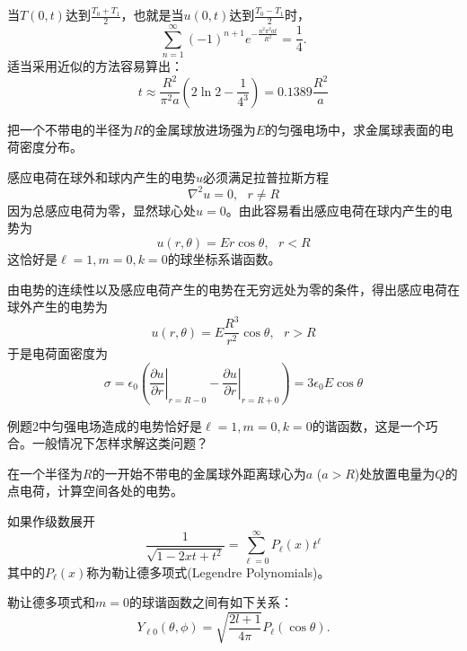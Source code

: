 \documentclass[CJK]{beamer}
\begin{document}
\begin{frame}
\bch
当$T(0,t)$达到$\frac{T_0+T_1}{2}$，也就是当$u(0,t)$达到$\frac{T_0-T_1}{2}$时，
$$\sum_{n=1}^\infty (-1)^{n+1} e^{-\frac{n^2\pi^2 at}{R^2}} = \frac{1}{4}.$$
适当采用近似的方法容易算出：
$$ t \approx \frac{R^2}{\pi^2a}\left(2\ln 2 - \frac{1}{4^3}\right) = 0.1389 \frac{R^2}{a} $$
\ech
\end{frame}



\begin{frame}
\bch


把一个不带电的半径为$R$的金属球放进场强为$E$的匀强电场中，求金属球表面的电荷密度分布。
\ech
\end{frame}


\begin{frame}
\bch

感应电荷在球外和球内产生的电势$u$必须满足拉普拉斯方程
$$\nabla^2 u = 0,\ \ \ r\ne R$$
因为总感应电荷为零，显然球心处$u=0$。由此容易看出感应电荷在球内产生的电势为
$$ u(r, \theta) = E r \cos\theta,\ \ \ r<R $$
这恰好是$\ell =1, m = 0, k=0$的球坐标系谐函数。

由电势的连续性以及感应电荷产生的电势在无穷远处为零的条件，得出感应电荷在球外产生的电势为
$$ u(r, \theta) = E \frac{R^3}{r^2}\cos\theta, \ \ \ r>R $$
于是电荷面密度为
$$\sigma =  \epsilon_0\left(\left.\frac{\partial u}{\partial r}\right\vert_{r=R-0}-\left.\frac{\partial u}{\partial r}\right\vert_{r=R+0}\right) = 3\epsilon_0E\cos\theta $$ 
\ech
\end{frame}



\begin{frame}
\bch


例题2中匀强电场造成的电势恰好是$\ell = 1, m = 0, k=0$的谐函数，这是一个巧合。一般情况下怎样求解这类问题？
\ech
\end{frame}



\begin{frame}
\bch
{}

在一个半径为$R$的一开始不带电的金属球外距离球心为$a$ ($a>R$)处放置电量为$Q$的点电荷，计算空间各处的电势。
\ech
\end{frame}


\begin{frame}
\bch
如果作级数展开
$$ \frac{1}{\sqrt{1-2xt+t^2}} = \sum_{\ell =0}^\infty P_\ell (x)t^\ell  $$
其中的{\blue $P_\ell(x)$称为勒让德多项式(Legendre Polynomials)}。

\skiplines

勒让德多项式和$m=0$的球谐函数之间有如下关系：
$$ Y_{\ell 0}(\theta, \phi) =\sqrt{\frac{2l+1}{4\pi}} P_{\ell}(\cos\theta). $$
\ech
\end{frame}
\end{document}
